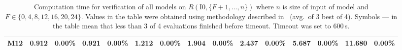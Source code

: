 {\begin{landscape}
\begin{table}[h]
\begin{center}
{\begin{tabular}{ l | r r | r r | r r | r r | r r | r r | r r }
M12&  0.912& 0.00\%&  0.921& 0.00\%&  1.212& 0.00\%&  1.904& 0.00\%&  2.437& 0.00\%&  5.687& 0.00\%& 11.680& 0.00\%\\\bottomrule
\end{tabular}
        }
    \end{center}
    \caption[Computation time of verification and robustness of all models based on different fixed bits]{%
    Computation time for verification of all models on $R(\text{I0}, \{F+1,\ldots,n\})$
    where $n$ is size of input of model and $F \in \{0,4,8,12,16,20,24\}$.
    Values in the table were obtained using methodology described in~
    (avg.\ of 3 best of 4). Symbols --- in the table mean that less than 3 of 4 evaluations finished
    before timeout. Timeout was set to 600\,s.
    }\label{tab:eval_big_fixed}%
\end{table}

    \end{landscape}%
    \clearpage%
    \restoregeometry%
}%
